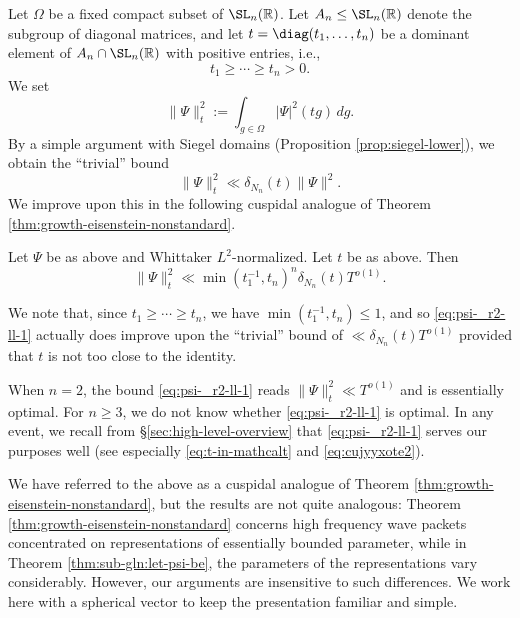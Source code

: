 Let $\Omega$ be a fixed compact subset of $\SL_n(\mathbb{R})$.  Let $A_n \leq \SL_n(\mathbb{R})$ denote the subgroup of diagonal matrices, and let $t = \diag(t_1,\dotsc,t_n)$ be a dominant element of $A_n \cap \SL_n(\mathbb{R})$ with positive entries, i.e.,
\begin{equation*}
  t_1 \geq \dotsb \geq t_n > 0.
\end{equation*}
We set
\begin{equation*}
  \|\Psi \|_t^2 := \int_{g \in \Omega } |\Psi|^2(t g) \, d g.
\end{equation*}
By a simple argument with Siegel domains (Proposition \ref{prop:siegel-lower}), we obtain  the ``trivial'' bound
\begin{equation}\label{eq:psi-_r2-ll-2}
  \|\Psi \|_t^2 \ll \delta_{N_n}(t) \|\Psi \|^2.
\end{equation}
We improve upon this in the following cuspidal analogue of Theorem \ref{thm:growth-eisenstein-nonstandard}.
\begin{theorem}\label{thm:sub-gln:let-psi-be}
  Let $\Psi$ be as above and Whittaker $L^2$-normalized.  Let $t$ be as above.  Then
  \begin{equation}\label{eq:psi-_r2-ll-1}
    \|\Psi \|_t^2 \ll \min(t_1^{-1}, t_n)^n \delta_{N_n}(t) T^{o(1)}.
  \end{equation}
\end{theorem}
\begin{remark}
  We note that, since $t_1 \geq \dotsb \geq t_n$, we have $\min(t_1^{-1}, t_n) \leq 1$, and so \eqref{eq:psi-_r2-ll-1} actually does improve upon the ``trivial'' bound of $\ll \delta_{N_n}(t) T^{o(1)}$ provided that $t$ is not too close to the identity.
\end{remark}
\begin{remark}
  When $n = 2$, the bound \eqref{eq:psi-_r2-ll-1} reads $\lVert \Psi \rVert_t^2 \ll T^{o(1)}$ and is essentially optimal.  For $n \geq 3$, we do not know whether \eqref{eq:psi-_r2-ll-1} is optimal.  In any event, we recall from \S\ref{sec:high-level-overview} that \eqref{eq:psi-_r2-ll-1} serves our purposes well (see especially \eqref{eq:t-in-mathcalt} and \eqref{eq:cujyyxote2}).
\end{remark}
\begin{remark}
  We have referred to the above as a cuspidal analogue of Theorem \ref{thm:growth-eisenstein-nonstandard}, but the results are not quite analogous: Theorem \ref{thm:growth-eisenstein-nonstandard} concerns high frequency wave packets concentrated on representations of essentially bounded parameter, while in Theorem \ref{thm:sub-gln:let-psi-be}, the parameters of the representations vary considerably.  However, our arguments are insensitive to such differences.  We work here with a spherical vector to keep the presentation familiar and simple.
\end{remark}
